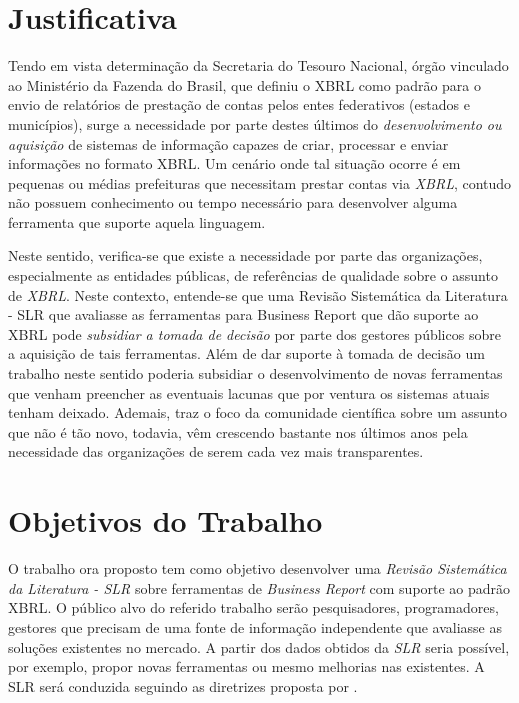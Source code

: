 \documentclass{article}
\begin{document}
\section{Justificativa}
\label{sec:contexto}

Tendo em vista determinação da Secretaria do Tesouro Nacional, órgão
vinculado ao  Ministério da Fazenda do Brasil, que definiu o XBRL como
padrão para o envio de relatórios de prestação de contas pelos entes
federativos (estados e municípios), surge a necessidade por parte
destes últimos do \textit{desenvolvimento ou aquisição} de sistemas de
informação capazes de criar, processar e enviar informações no formato
XBRL. Um cenário onde tal situação ocorre é em pequenas ou médias
prefeituras que necessitam prestar contas via \textit{XBRL}, contudo
não possuem conhecimento ou tempo necessário para desenvolver alguma
ferramenta que suporte aquela linguagem.

Neste sentido,  verifica-se que existe a necessidade por parte das
organizações, especialmente as entidades públicas, de referências de
qualidade sobre o assunto de \textit{XBRL}. Neste contexto, entende-se que uma Revisão Sistemática da
  Literatura - SLR  que avaliasse as ferramentas para Business Report que dão suporte ao
XBRL pode \textit{subsidiar a tomada de decisão} por parte dos gestores
públicos sobre a aquisição de tais ferramentas. Além de dar suporte à
tomada de decisão um trabalho neste sentido poderia subsidiar o
desenvolvimento de novas ferramentas que venham preencher as eventuais
lacunas que por ventura os sistemas atuais tenham deixado. Ademais,
traz o foco da comunidade científica sobre um assunto que não é tão
novo, todavia, vêm crescendo bastante nos últimos anos pela
necessidade das organizações de serem cada vez mais transparentes. 

\section{Objetivos do Trabalho}
\label{sec:objetivos}

O trabalho ora proposto tem como objetivo desenvolver  uma \textit{Revisão Sistemática da Literatura -
  SLR} sobre ferramentas de \textit{Business Report} com suporte ao padrão XBRL. O público alvo do referido trabalho serão pesquisadores,
programadores, gestores que precisam de uma fonte de informação independente que avaliasse as soluções existentes no mercado. A partir
dos dados obtidos da \textit{SLR} seria possível, por exemplo, propor
novas ferramentas ou mesmo melhorias nas existentes. A SLR será
conduzida seguindo as diretrizes proposta por \cite{keele2007guidelines,wohlin2012experimentation}.
\end{document}
